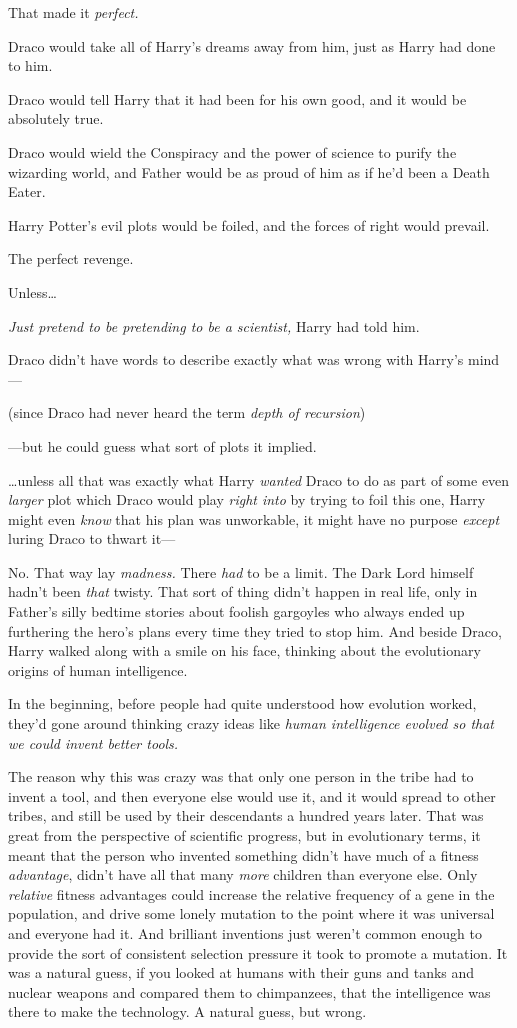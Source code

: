 That made it \emph{perfect.}

Draco would take all of Harry's dreams away from him, just as Harry had done to
him.

Draco would tell Harry that it had been for his own good, and it would be
absolutely true.

Draco would wield the Conspiracy and the power of science to purify the
wizarding world, and Father would be as proud of him as if he'd been a Death
Eater.

Harry Potter's evil plots would be foiled, and the forces of right would
prevail.

The perfect revenge.

Unless…

\emph{Just pretend to be pretending to be a scientist,} Harry had told him.

Draco didn't have words to describe exactly what was wrong with Harry's mind---

(since Draco had never heard the term \emph{depth of recursion})

---but he could guess what sort of plots it implied.

…unless all that was exactly what Harry \emph{wanted} Draco to do as
part of some even \emph{larger} plot which Draco would play \emph{right into}
by trying to foil this one, Harry might even \emph{know} that his plan was
unworkable, it might have no purpose \emph{except} luring Draco to thwart it---

No. That way lay \emph{madness.} There \emph{had} to be a limit. The Dark Lord
himself hadn't been \emph{that} twisty. That sort of thing didn't happen in
real life, only in Father's silly bedtime stories about foolish gargoyles who
always ended up furthering the hero's plans every time they tried to stop him.
\later
And beside Draco, Harry walked along with a smile on his face, thinking about
the evolutionary origins of human intelligence.

In the beginning, before people had quite understood how evolution worked,
they'd gone around thinking crazy ideas like \emph{human intelligence evolved
so that we could invent better tools.}

The reason why this was crazy was that only one person in the tribe had to
invent a tool, and then everyone else would use it, and it would spread to
other tribes, and still be used by their descendants a hundred years later.
That was great from the perspective of scientific progress, but in evolutionary
terms, it meant that the person who invented something didn't have much of a
fitness \emph{advantage}, didn't have all that many \emph{more} children than
everyone else. Only \emph{relative} fitness advantages could increase the
relative frequency of a gene in the population, and drive some lonely mutation
to the point where it was universal and everyone had it. And brilliant
inventions just weren't common enough to provide the sort of consistent
selection pressure it took to promote a mutation. It was a natural guess, if
you looked at humans with their guns and tanks and nuclear weapons and compared
them to chimpanzees, that the intelligence was there to make the technology. A
natural guess, but wrong.


